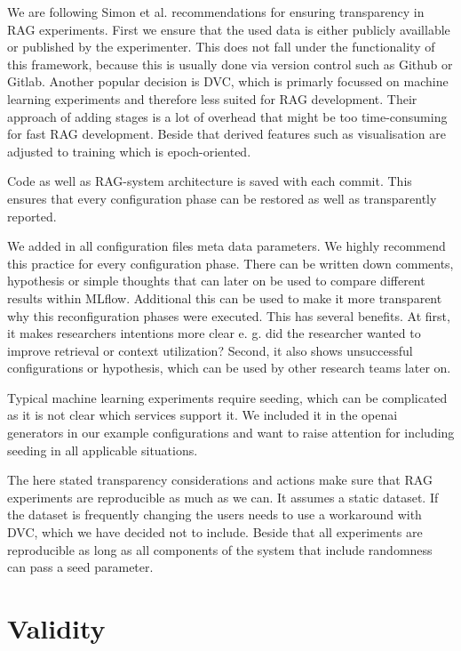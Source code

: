 We are following Simon et al.\cite{Simon.10112024} recommendations for ensuring transparency in RAG experiments. First we ensure that the used data is either publicly availlable or published by the experimenter. This does not fall under the functionality of this framework, because this is usually done via version control such as Github\cite{github-inc-2025} or Gitlab\cite{gitlab-inc-2025}. Another popular decision is DVC\cite{dvc.17.03.2025}, which is primarly focussed on machine learning experiments and therefore less suited for RAG development. Their approach of adding stages is a lot of overhead that might be too time-consuming for fast RAG development. Beside that derived features such as visualisation are adjusted to training which is epoch-oriented. 

Code as well as RAG-system architecture is saved with each commit. This ensures that every configuration phase can be restored as well as transparently reported. 

We added in all configuration files meta data parameters. We highly recommend this practice for every configuration phase. There can be written down comments, hypothesis or simple thoughts that can later on be used to compare different results within MLflow. Additional this can be used to make it more transparent why this reconfiguration phases were executed. This has several benefits.
At first, it makes researchers intentions more clear e. g. did the researcher wanted to improve retrieval or context utilization? 
Second, it also shows unsuccessful configurations or hypothesis, which can be used by other research teams later on.

Typical machine learning experiments require seeding, which can be complicated as it is not clear which services support it. We included it in the openai generators in our example configurations and want to raise attention for including seeding in all applicable situations.

The here stated transparency considerations and actions make sure that RAG experiments are reproducible as much as we can. It assumes a static dataset. If the dataset is frequently changing the users needs to use a workaround with DVC, which we have decided not to include.
Beside that all experiments are reproducible as long as all components of the system that include randomness can pass a seed parameter.

\section{Validity}

